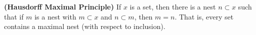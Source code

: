 \textbf{(Hausdorff Maximal Principle)} If $x$ is a set, then there is a nest $n \subset x$ such that if $m$ is a nest with $m \subset x$ and $n \subset m$, then $m = n$. That is, every set contains a maximal nest (with respect to inclusion).
